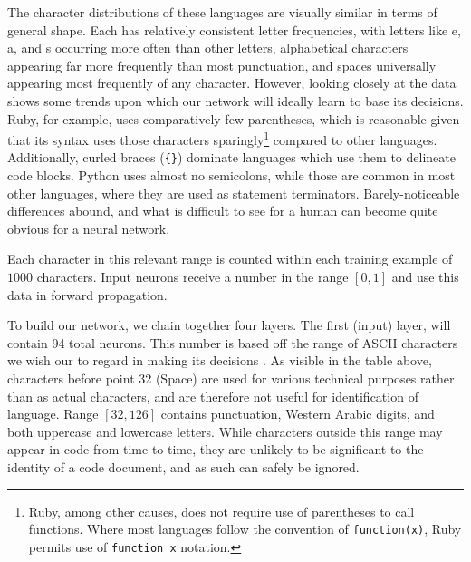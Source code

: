 \documentclass{article}
\begin{document}
\begin{center}
\end{center}
The character distributions of these languages are visually similar in terms of general shape. Each has relatively consistent letter frequencies, with letters like e, a, and s occurring more often than other letters, alphabetical characters appearing far more frequently than most punctuation, and spaces universally appearing most frequently of any character. However, looking closely at the data shows some trends upon which our network will ideally learn to base its decisions. Ruby, for example, uses comparatively few parentheses, which is reasonable given that its syntax uses those characters sparingly\footnote{Ruby, among other causes, does not require use of parentheses to call functions. Where most languages follow the convention of \texttt{function(x)}, Ruby permits use of \texttt{function x} notation.} compared to other languages. Additionally, curled braces (\texttt{\{\}}) dominate languages which use them to delineate code blocks. Python uses almost no semicolons, while those are common in most other languages, where they are used as statement terminators. Barely-noticeable differences abound, and what is difficult to see for a human can become quite obvious for a neural network.

Each character in this relevant range is counted within each training example of $1000$ characters. Input neurons receive a number in the range $[0,1]$ and use this data in forward propagation.

To build our network, we chain together four layers. The first (input) layer, will contain 94 total neurons. This number is based off the range of ASCII characters we wish our to regard in making its decisions \cite{asciitable}. As visible in the table above, characters before point 32 (Space) are used for various technical purposes rather than as actual characters, and are therefore not useful for identification of language. Range $[32,126]$ contains punctuation, Western Arabic digits, and both uppercase and lowercase letters. While characters outside this range may appear in code from time to time, they are unlikely to be significant to the identity of a code document, and as such can safely be ignored.
\end{document}
